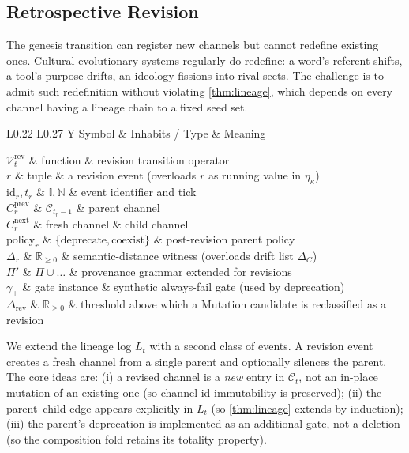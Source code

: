 \documentclass[journal,onecolumn,11pt]{IEEEtran}
\theoremstyle{definition}
\newcommand{\notationtable}[3]{%
  \begin{table}[ht]
  \centering
  \caption{#1}
  \label{#2}
  \small
  \renewcommand{\arraystretch}{1.1}
  \begin{tabularx}{\linewidth}{L{0.22\linewidth} L{0.27\linewidth} Y}
  \toprule
  Symbol & Inhabits / Type & Meaning \\
  \midrule
  #3
  \bottomrule
  \end{tabularx}
  \end{table}%
}
\begin{document}
\subsection{Retrospective Revision}
\label{sec:revision}

The genesis transition can register new channels but cannot redefine existing ones. Cultural-evolutionary systems regularly do redefine: a word's referent shifts, a tool's purpose drifts, an ideology fissions into rival sects. The challenge is to admit such redefinition without violating \cref{thm:lineage}, which depends on every channel having a lineage chain to a fixed seed set.

\notationtable{Symbols introduced in \cref{sec:revision}.}{tab:notation-revision}{
$\mathcal{V}_t^{\mathrm{rev}}$ & function               & revision transition operator \\
$r$                       & tuple                        & a revision event (overloads $r$ as running value in $\eta_\kappa$) \\
$\mathrm{id}_r, t_r$      & $\mathbb{I}, \mathbb{N}$     & event identifier and tick \\
$C_r^{\mathrm{prev}}$     & $\mathcal{C}_{t_r - 1}$      & parent channel \\
$C_r^{\mathrm{next}}$     & fresh channel                & child channel \\
$\mathrm{policy}_r$       & $\{\mathrm{deprecate}, \mathrm{coexist}\}$ & post-revision parent policy \\
$\Delta_r$                & $\mathbb{R}_{\ge 0}$         & semantic-distance witness (overloads drift list $\Delta_C$) \\
$\Pi'$                    & $\Pi \cup \dots$             & provenance grammar extended for revisions \\
$\gamma_\bot$             & gate instance                & synthetic always-fail gate (used by deprecation) \\
$\Delta_{\mathrm{rev}}$   & $\mathbb{R}_{\ge 0}$         & threshold above which a Mutation candidate is reclassified as a revision \\
}

We extend the lineage log $L_t$ with a second class of events. A revision event creates a fresh channel from a single parent and optionally silences the parent. The core ideas are: (i) a revised channel is a \emph{new} entry in $\mathcal{C}_t$, not an in-place mutation of an existing one (so channel-id immutability is preserved); (ii) the parent--child edge appears explicitly in $L_t$ (so \cref{thm:lineage} extends by induction); (iii) the parent's deprecation is implemented as an additional gate, not a deletion (so the composition fold retains its totality property).
\end{document}
